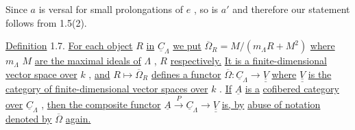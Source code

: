 \begin{center}
\end{center}
Since  $a$  is versal for small prolongations of  $e$  , so is  $a'$ and therefore our statement follows from 1.5(2).

\underline{Definition} 1.7.   \underline{For each object}  $R$  \underline{in}  $\underline{C}_{\Lambda}$ \underline{we put}  $\overline{\Omega}_R = M/(m_{\Lambda}R+M^2)$  \underline{where}  \underline{$m_{\Lambda}$} $M$  \underline{are the maximal ideals of}  $\Lambda$ ,  $R$  \underline{respectively.} \underline{It is a finite-dimensional vector space over}  $k$  , \underline{and}  $R \longmapsto \overline{\Omega}_R$  \underline{defines a functor}  $\overline{\Omega} : \underline{C}_{\Lambda} \rightarrow \underline{\underline{V}}$  \underline{where} $\underline{\underline{V}}$  \underline{is the category of finite-dimensional vector spaces over}  $k$  . \underline{If}  $\underline{A}$  \underline{is a} \underline{cofibered category over}  $\underline{C}_{\Lambda}$  , \underline{then the composite functor}  $\underline{A} \xrightarrow{\ P\ } \underline{C}_{\Lambda} \rightarrow \underline{\underline{V}}$  \underline{is, by} \underline{abuse of notation denoted by}  $\overline{\Omega}$  \underline{again.}

